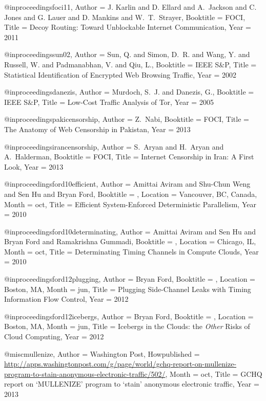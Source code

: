 {{{{{	@inproceedings{foci11,
	Author = {J. Karlin and D. Ellard and A.~Jackson and C.~ Jones and G. Lauer and D. Mankins and W.~T.~Strayer},
	Booktitle = {FOCI},
	Title = {{Decoy Routing: Toward Unblockable Internet Communication}},
	Year = 2011}
	
	@inproceedings{sun02,
	Author = {Sun, Q. and Simon, D.~R. and Wang, Y. and Russell, W. and Padmanabhan, V. and Qiu, L.},
	Booktitle = {IEEE S\&P},
	Title = {{Statistical Identification of Encrypted Web Browsing Traffic}},
	Year = {2002}}
	
	@inproceedings{danezis,
	Author = {Murdoch, S.~J. and Danezis, G.},
	Booktitle = {IEEE S\&P},
	Title = {{Low-Cost Traffic Analysis of Tor}},
	Year = {2005}}
	
	@inproceedings{pakicensorship,
	Author = {Z.~Nabi},
	Booktitle = {FOCI},
	Title = {The Anatomy of {Web} Censorship in {Pakistan}},
	Year = {2013}}
	
	@inproceedings{irancensorship,
	Author = {S.~Aryan and H.~Aryan and A.~Halderman},
	Booktitle = {FOCI},
	Title = {Internet Censorship in {Iran}: {A} First Look},
	Year = {2013}}
	
	@inproceedings{ford10efficient,
	Author = {Amittai Aviram and Shu-Chun Weng and Sen Hu and Bryan Ford},
	Booktitle = {},
	Location = {Vancouver, BC, Canada},
	Month = oct,
	Title = {Efficient System-Enforced Deterministic Parallelism},
	Year = 2010}
	
	@inproceedings{ford10determinating,
	Author = {Amittai Aviram and Sen Hu and Bryan Ford and Ramakrishna Gummadi},
	Booktitle = {},
	Location = {Chicago, IL},
	Month = oct,
	Title = {Determinating Timing Channels in Compute Clouds},
	Year = 2010}
	
	@inproceedings{ford12plugging,
	Author = {Bryan Ford},
	Booktitle = {},
	Location = {Boston, MA},
	Month = jun,
	Title = {Plugging Side-Channel Leaks with Timing Information Flow Control},
	Year = 2012}
	
	@inproceedings{ford12icebergs,
	Author = {Bryan Ford},
	Booktitle = {},
	Location = {Boston, MA},
	Month = jun,
	Title = {Icebergs in the Clouds: the {\em Other} Risks of Cloud Computing},
	Year = 2012}
	
	@misc{mullenize,
	Author = {Washington Post},
	Howpublished = {\url{http://apps.washingtonpost.com/g/page/world/gchq-report-on-mullenize-program-to-stain-anonymous-electronic-traffic/502/}},
	Month = {oct},
	Title = {{GCHQ} report on {`MULLENIZE'} program to `stain' anonymous electronic traffic},
	Year = {2013}}
	
}}}}}
